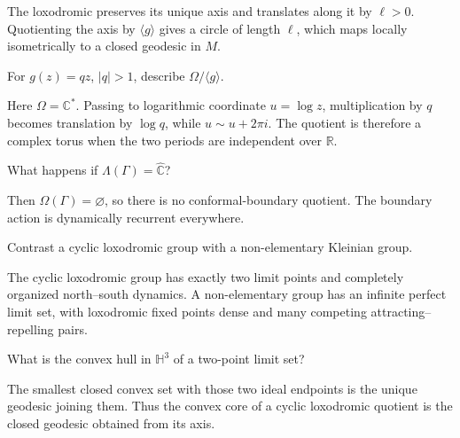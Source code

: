 \begin{solution}
The loxodromic preserves its unique axis and translates along it by \(\ell>0\).  Quotienting the axis by \(\langle g\rangle\) gives a circle of length \(\ell\), which maps locally isometrically to a closed geodesic in \(M\).
\end{solution}

\begin{problem}\label{prob:vii37-07}
For \(g(z)=qz\), \(|q|>1\), describe \(\Omega/\langle g\rangle\).
\end{problem}

\begin{solution}
Here \(\Omega=\mathbb C^*\).  Passing to logarithmic coordinate \(u=\log z\), multiplication by \(q\) becomes translation by \(\log q\), while \(u\sim u+2\pi i\).  The quotient is therefore a complex torus when the two periods are independent over \(\mathbb R\).
\end{solution}

\begin{problem}\label{prob:vii37-08}
What happens if \(\Lambda(\Gamma)=\widehat{\mathbb C}\)?
\end{problem}

\begin{solution}
Then \(\Omega(\Gamma)=\varnothing\), so there is no conformal-boundary quotient.  The boundary action is dynamically recurrent everywhere.
\end{solution}

\begin{problem}\label{prob:vii37-09}
Contrast a cyclic loxodromic group with a non-elementary Kleinian group.
\end{problem}

\begin{solution}
The cyclic loxodromic group has exactly two limit points and completely organized north--south dynamics.  A non-elementary group has an infinite perfect limit set, with loxodromic fixed points dense and many competing attracting--repelling pairs.
\end{solution}

\begin{problem}\label{prob:vii37-10}
What is the convex hull in \(\mathbb H^3\) of a two-point limit set?
\end{problem}

\begin{solution}
The smallest closed convex set with those two ideal endpoints is the unique geodesic joining them.  Thus the convex core of a cyclic loxodromic quotient is the closed geodesic obtained from its axis.
\end{solution}

